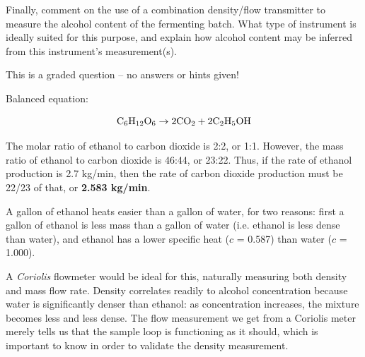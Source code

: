 \vskip 10pt

Finally, comment on the use of a combination density/flow transmitter to measure the alcohol content of the fermenting batch.  What type of instrument is ideally suited for this purpose, and explain how alcohol content may be inferred from this instrument's measurement(s).

\vfil

\eject






This is a graded question -- no answers or hints given!







\noindent
Balanced equation:

$$\hbox{C}_6 \hbox{H}_{12} \hbox{O}_6 \to 2 \hbox{CO}_2 + 2 \hbox{C}_2 \hbox{H}_5 \hbox{OH}$$

\vskip 10pt

The molar ratio of ethanol to carbon dioxide is 2:2, or 1:1.  However, the mass ratio of ethanol to carbon dioxide is 46:44, or 23:22.  Thus, if the rate of ethanol production is 2.7 kg/min, then the rate of carbon dioxide production must be 22/23 of that, or {\bf 2.583 kg/min}.

\vskip 10pt

A gallon of ethanol heats easier than a gallon of water, for two reasons: first a gallon of ethanol is less mass than a gallon of water (i.e. ethanol is less dense than water), and ethanol has a lower specific heat ($c$ = 0.587) than water ($c$ = 1.000).

\vskip 10pt

A {\it Coriolis} flowmeter would be ideal for this, naturally measuring both density and mass flow rate.  Density correlates readily to alcohol concentration because water is significantly denser than ethanol: as concentration increases, the mixture becomes less and less dense.  The flow measurement we get from a Coriolis meter merely tells us that the sample loop is functioning as it should, which is important to know in order to validate the density measurement.




